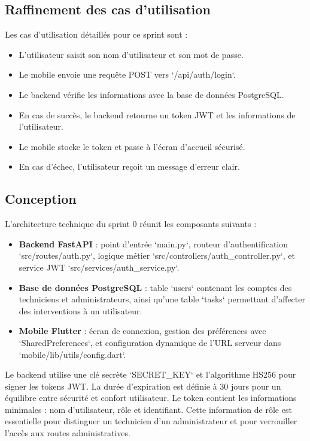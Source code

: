 \documentclass[12pt,a4paper]{report}
\begin{document}
\subsection{Raffinement des cas d'utilisation}
\noindent Les cas d'utilisation détaillés pour ce sprint sont :
\begin{itemize}
    \item L'utilisateur saisit son nom d'utilisateur et son mot de passe.
    \item Le mobile envoie une requête POST vers `/api/auth/login`.
    \item Le backend vérifie les informations avec la base de données PostgreSQL.
    \item En cas de succès, le backend retourne un token JWT et les informations de l'utilisateur.
    \item Le mobile stocke le token et passe à l'écran d'accueil sécurisé.
    \item En cas d'échec, l'utilisateur reçoit un message d'erreur clair.
\end{itemize}

\subsection{Conception}
\noindent L'architecture technique du sprint 0 réunit les composants suivants :
\begin{itemize}
    \item \textbf{Backend FastAPI} : point d'entrée `main.py`, routeur d'authentification `src/routes/auth.py`, logique métier `src/controllers/auth_controller.py`, et service JWT `src/services/auth_service.py`.
    \item \textbf{Base de données PostgreSQL} : table `users` contenant les comptes des techniciens et administrateurs, ainsi qu'une table `tasks` permettant d'affecter des interventions à un utilisateur.
    \item \textbf{Mobile Flutter} : écran de connexion, gestion des préférences avec `SharedPreferences`, et configuration dynamique de l'URL serveur dans `mobile/lib/utils/config.dart`.
\end{itemize}

\noindent Le backend utilise une clé secrète `SECRET_KEY` et l'algorithme HS256 pour signer les tokens JWT. La durée d'expiration est définie à 30 jours pour un équilibre entre sécurité et confort utilisateur. Le token contient les informations minimales : nom d'utilisateur, rôle et identifiant. Cette information de rôle est essentielle pour distinguer un technicien d'un administrateur et pour verrouiller l'accès aux routes administratives.
\end{document}
